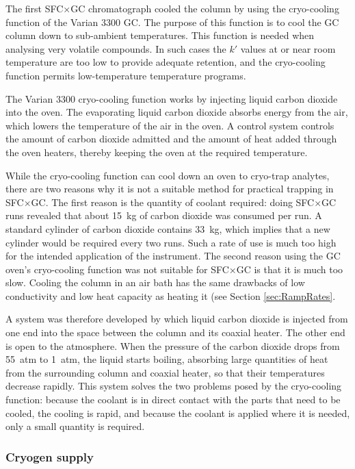 The first SFC×GC chromatograph cooled the column by using the cryo-cooling
function of the Varian 3300 GC. The purpose of this function is to cool the GC
column down to sub-ambient temperatures. This function is needed when analysing
very volatile compounds. In such cases the \(k'\) values at or near room
temperature are too low to provide adequate retention, and the cryo-cooling
function permits low-temperature temperature programs.

The Varian 3300 cryo-cooling function works by injecting liquid carbon dioxide
into the oven. The evaporating liquid carbon dioxide absorbs energy from the
air, which lowers the temperature of the air in the oven. A control system
controls the amount of carbon dioxide admitted and the amount of heat added
through the oven heaters, thereby keeping the oven at the required temperature.

While the cryo-cooling function can cool down an oven to cryo-trap analytes,
there are two reasons why it is not a suitable method for practical trapping in
SFC×GC. The first reason is the quantity of coolant required: doing SFC×GC runs
revealed that about \SI{15}{\kilogram} of carbon dioxide was consumed per
run. A standard cylinder of carbon dioxide contains \SI{33}{\kilogram}, which
implies that a new cylinder would be required every two runs. Such a rate of use
is much too high for the intended application of the instrument. The second
reason using the GC oven's cryo-cooling function was not suitable for SFC×GC is
that it is much too slow. Cooling the column in an air bath has the same
drawbacks of low conductivity and low heat capacity as heating it (see Section
\ref{sec:RampRates}.

A system was therefore developed by which liquid carbon dioxide is injected from
one end into the space between the column and its coaxial heater. The other end
is open to the atmosphere. When the pressure of the carbon dioxide drops from
\SI{55}{atm} to \SI{1}{atm}, the liquid starts boiling, absorbing large
quantities of heat from the surrounding column and coaxial heater, so that their
temperatures decrease rapidly. This system solves the two problems posed by the
cryo-cooling function: because the coolant is in direct contact with the parts
that need to be cooled, the cooling is rapid, and because the coolant is applied
where it is needed, only a small quantity is required.

\subsubsection{Cryogen supply}



